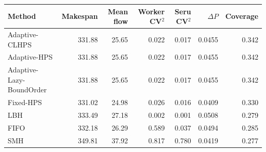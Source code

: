 \begin{tabular}{lrrrrrr}
\hline
Method & Makespan & Mean flow & Worker CV$^2$ & Seru CV$^2$ & $\Delta P$ & Coverage \\
\hline
Adaptive-CLHPS & 331.88 & 25.65 & 0.022 & 0.017 & 0.0455 & 0.342 \\
Adaptive-HPS & 331.88 & 25.65 & 0.022 & 0.017 & 0.0455 & 0.342 \\
Adaptive-Lazy-BoundOrder & 331.88 & 25.65 & 0.022 & 0.017 & 0.0455 & 0.342 \\
Fixed-HPS & 331.02 & 24.98 & 0.026 & 0.016 & 0.0409 & 0.330 \\
LBH & 333.49 & 27.18 & 0.002 & 0.001 & 0.0508 & 0.279 \\
FIFO & 332.18 & 26.29 & 0.589 & 0.037 & 0.0494 & 0.285 \\
SMH & 349.81 & 37.92 & 0.817 & 0.780 & 0.0419 & 0.277 \\
\hline
\end{tabular}
